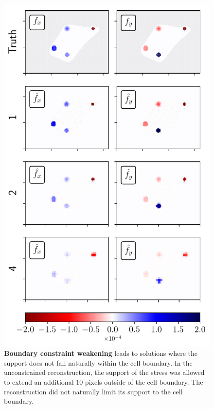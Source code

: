 \documentclass[aps,prl,reprint,twocolumn,groupedaddress,showpacs]{revtex4-1}
\begin{document}
\begin{figure}
\includegraphics[width=\linewidth]{fig4}
\caption{\textbf{Boundary constraint weakening} leads to solutions
  where the support does not fall naturally within the cell
  boundary. In the unconstrained reconstruction, the support of the
  stress was allowed to extend an additional $10$ pixels outside of
  the cell boundary. The reconstruction did not naturally limit its
  support to the cell boundary.}
\label{fig:fig4}
\end{figure}
\end{document}
